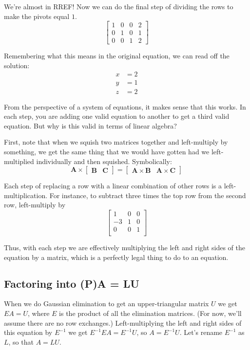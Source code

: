 \documentclass[10pt,letterpaper,twocolumn]{article}
\newcommand{\matr}[1]{\mathbf{#1}}
\begin{document}
We're almost in RREF! Now we can do the final step of dividing the rows to make the pivots equal $1$.
$$
\begin{bmatrix}
1 & 0 & 0 & 2 \\
0 & 1 & 0 & 1 \\
0 & 0 & 1 & 2
\end{bmatrix}
$$

Remembering what this means in the original equation, we can read off the solution:
\begin{align*}
	x &= 2 \\
	y &= 1 \\
	z &= 2
\end{align*}

From the perspective of a system of equations, it makes sense that this works. In each step, you are adding one valid equation to another to get a third valid equation. But why is this valid in terms of linear algebra?

First, note that when we squish two matrices together and left-multiply by something, we get the same thing that we would have gotten had we left-multiplied individually and then squished. Symbolically:
$$
\matr{A} \times 
\begin{bmatrix}
\matr{B} & \matr{C}
\end{bmatrix}
=
\begin{bmatrix}
\matr{A} \times \matr{B} & \matr{A} \times \matr{C}
\end{bmatrix}
$$

Each step of replacing a row with a linear combination of other rows is a left-multiplication. For instance, to subtract three times the top row from the second row, left-multiply by
$$
\begin{bmatrix}
1 & 0 & 0 \\
-3 & 1 & 0 \\
0 & 0 & 1 \\
\end{bmatrix}
$$

Thus, with each step we are effectively multiplying the left and right sides of the equation by a matrix, which is a perfectly legal thing to do to an equation. 

\subsection{Factoring into (P)A = LU}

When we do Gaussian elimination to get an upper-triangular matrix $U$ we get $E A = U$, where $E$ is the product of all the elimination matrices. (For now, we'll assume there are no row exchanges.) Left-multiplying the left and right sides of this equation by $E^{-1}$ we get $E^{-1} E A = E^{-1} U$, so $A = E^{-1} U$. Let's rename $E^{-1}$ as $L$, so that $A = LU$.
\end{document}

